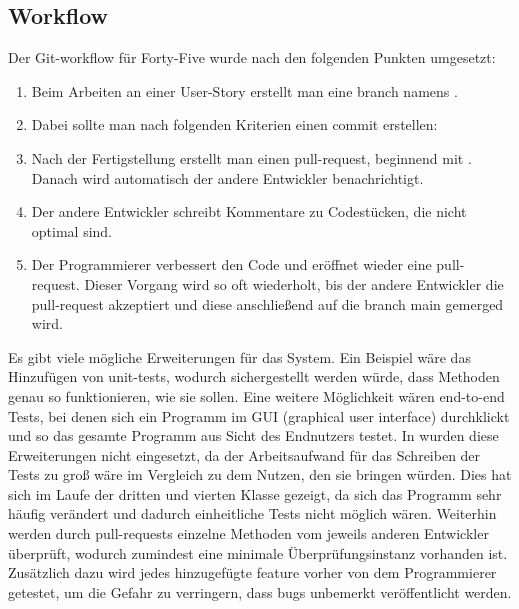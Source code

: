 \renewcommand{\kapitelautor}{Autor: Felix Zwickelstorfer}
\subsection{Workflow}\label{subsec:workflow}

Der Git-workflow für Forty-Five wurde nach den folgenden Punkten umgesetzt:
\begin{enumerate}
    \item Beim Arbeiten an einer User-Story erstellt man eine branch namens .
    \item Dabei sollte man nach folgenden Kriterien einen commit erstellen:
    \item Nach der Fertigstellung erstellt man einen pull-request, beginnend mit \quoted{[ff-xxx]}.
    Danach wird automatisch der andere Entwickler benachrichtigt.
    \item Der andere Entwickler schreibt Kommentare zu Codestücken, die nicht optimal sind.
    \item Der Programmierer verbessert den Code und eröffnet wieder eine pull-request.
    Dieser Vorgang wird so oft wiederholt, bis der andere Entwickler die pull-request akzeptiert und diese anschließend auf die branch main gemerged wird.
\end{enumerate}

Es gibt viele mögliche Erweiterungen für das System.
Ein Beispiel wäre das Hinzufügen von unit-tests, wodurch sichergestellt werden würde, dass Methoden genau so funktionieren, wie sie sollen.
Eine weitere Möglichkeit wären end-to-end Tests, bei denen sich ein Programm im GUI (graphical user interface) durchklickt und so das gesamte Programm aus Sicht des Endnutzers testet.
In \FF wurden diese Erweiterungen nicht eingesetzt, da der Arbeitsaufwand für das Schreiben der Tests zu groß wäre im Vergleich zu dem Nutzen, den sie bringen würden.
Dies hat sich im Laufe der dritten und vierten Klasse gezeigt, da sich das Programm sehr häufig verändert und dadurch einheitliche Tests nicht möglich wären.
Weiterhin werden durch pull-requests einzelne Methoden vom jeweils anderen Entwickler überprüft, wodurch zumindest eine minimale Überprüfungsinstanz vorhanden ist.
Zusätzlich dazu wird jedes hinzugefügte feature vorher von dem Programmierer getestet, um die Gefahr zu verringern, dass bugs unbemerkt veröffentlicht werden.

